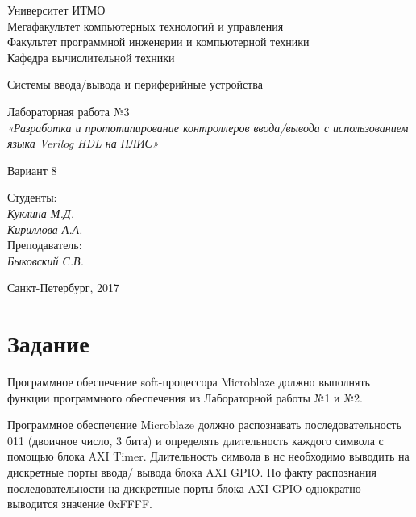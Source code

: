 \documentclass[12pt, a4paper] {ncc}
\begin{document}
\setcounter{figure}{0}
\frenchspacing
\pagestyle{empty}
\begin{center}
                            Университет ИТМО    \\
					Мегафакультет компьютерных технологий и управления \\ 
					Факультет программной инженерии и компьютерной техники \\
                        Кафедра вычислительной техники

                Системы ввода/вывода и периферийные устройства
\end{center}
\begin{center}

                Лабораторная работа №3\\
			{\it «Разработка и прототипирование контроллеров 
                ввода/вывода с использованием языка Verilog HDL на ПЛИС»}

					Вариант 8
\end{center}
\begin{flushright}
                                    Студенты:\\
                                    {\it Куклина М.Д.}\\
                                    {\it Кириллова А.А.}\\
                                    Преподаватель: \\
                                    {\it Быковский С.В.}
\end{flushright}
\begin{center}
                             Санкт-Петербург, 2017
\end{center}
\newpage


\section{Задание}

Программное обеспечение soft-процессора Microblaze должно выполнять 
функции программного обеспечения из Лабораторной работы №1 и №2. 
 
Программное обеспечение Microblaze должно распознавать последовательность 
011 (двоичное число, 3 бита) и определять длительность каждого символа с 
помощью блока AXI Timer. Длительность символа в нс необходимо выводить на 
дискретные порты ввода/ вывода блока AXI GPIO. По факту распознания 
последовательности на дискретные порты блока AXI GPIO однократно выводится 
значение 0xFFFF. 
 
\end{document}
